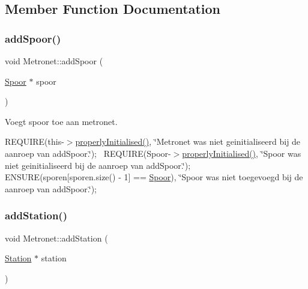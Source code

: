 \subsection{Member Function Documentation}
\mbox{\label{class_metronet_ab6faa9e35828352e4003640d13798529}} 
\subsubsection{\texorpdfstring{add\+Spoor()}{addSpoor()}}
{\footnotesize\ttfamily void Metronet\+::add\+Spoor (\begin{DoxyParamCaption}\item[{\hyperlink{class_spoor}{Spoor} $\ast$}]{spoor }\end{DoxyParamCaption})}



Voegt spoor toe aan metronet. 

R\+E\+Q\+U\+I\+RE(this-\/$>$\hyperlink{class_metronet_a3d2adce29a947f162924279b766de645}{properly\+Initialised()}, \char`\"{}\+Metronet was niet geinitialiseerd bij de aanroep van add\+Spoor.\char`\"{});~\newline
R\+E\+Q\+U\+I\+RE(Spoor-\/$>$\hyperlink{class_metronet_a3d2adce29a947f162924279b766de645}{properly\+Initialised()}, \char`\"{}\+Spoor was niet geinitialiseerd bij de aanroep van add\+Spoor.\char`\"{});~\newline
E\+N\+S\+U\+RE(sporen\mbox{[}sporen.\+size() -\/ 1\mbox{]} == \hyperlink{class_spoor}{Spoor}), \char`\"{}\+Spoor was niet toegevoegd bij de aanroep van add\+Spoor.\char`\"{});~\newline
\mbox{\label{class_metronet_a37106294bf52324b0fb9fcecf11e5495}} 
\subsubsection{\texorpdfstring{add\+Station()}{addStation()}}
{\footnotesize\ttfamily void Metronet\+::add\+Station (\begin{DoxyParamCaption}\item[{\hyperlink{class_station}{Station} $\ast$}]{station }\end{DoxyParamCaption})}



